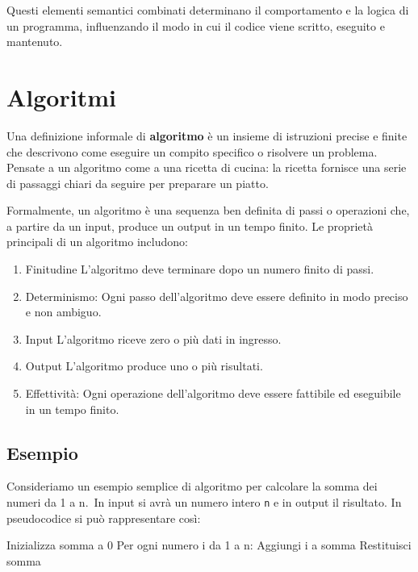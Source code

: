 \documentclass[
  letterpaper,
  DIV=11,
  numbers=noendperiod]{scrreprt}
\newenvironment{Shaded}{\begin{snugshade}}{\end{snugshade}}
\newcommand{\NormalTok}[1]{\textcolor[rgb]{0.00,0.23,0.31}{#1}}
\providecommand{\tightlist}{%
  \setlength{\itemsep}{0pt}\setlength{\parskip}{0pt}}\usepackage{longtable,booktabs,array}
\begin{document}
Questi elementi semantici combinati determinano il comportamento e la
logica di un programma, influenzando il modo in cui il codice viene
scritto, eseguito e mantenuto.

\section{Algoritmi}\label{algoritmi}

Una definizione informale di \textbf{algoritmo} è un insieme di
istruzioni precise e finite che descrivono come eseguire un compito
specifico o risolvere un problema. Pensate a un algoritmo come a una
ricetta di cucina: la ricetta fornisce una serie di passaggi chiari da
seguire per preparare un piatto.

Formalmente, un algoritmo è una sequenza ben definita di passi o
operazioni che, a partire da un input, produce un output in un tempo
finito. Le proprietà principali di un algoritmo includono:

\begin{enumerate}
\def\labelenumi{\arabic{enumi}.}
\tightlist
\item
  Finitudine L'algoritmo deve terminare dopo un numero finito di passi.
\item
  Determinismo: Ogni passo dell'algoritmo deve essere definito in modo
  preciso e non ambiguo.
\item
  Input L'algoritmo riceve zero o più dati in ingresso.
\item
  Output L'algoritmo produce uno o più risultati.
\item
  Effettività: Ogni operazione dell'algoritmo deve essere fattibile ed
  eseguibile in un tempo finito.
\end{enumerate}

\subsection{Esempio}\label{esempio}

Consideriamo un esempio semplice di algoritmo per calcolare la somma dei
numeri da 1 a n.~In input si avrà un numero intero \texttt{n} e in
output il risultato. In pseudocodice si può rappresentare così:

\begin{Shaded}
\begin{Highlighting}[]
\NormalTok{Inizializza somma a 0}
\NormalTok{Per ogni numero i da 1 a n:}
\NormalTok{  Aggiungi i a somma}
\NormalTok{Restituisci somma}
\end{Highlighting}
\end{Shaded}
\end{document}
